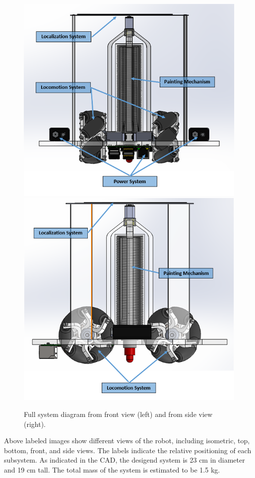 \begin{figure}
\centering
\includegraphics[width=0.9\columnwidth]{hardware/CAD/Full System/Full_System_Front.PNG}
\includegraphics[width=0.9\columnwidth]{hardware/CAD/Full System/Full_System_Side.PNG}
\caption{Full system diagram from front view (left) and from side view (right).}
\label{fig:full-sys-diagram-front}
\end{figure}

Above labeled images show different views of the robot, including isometric, top, bottom, front, and side views. The labels indicate the relative positioning of each subsystem. As indicated in the CAD, the desigend system is 23 cm in diameter and 19 cm tall. The total mass of the system is estimated to be 1.5 kg.  

